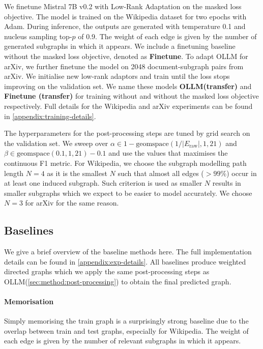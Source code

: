 \documentclass{article}
\newcommand{\name}{{OLLM}\xspace}
\begin{document}
We finetune Mistral 7B v0.2 \cite{jiang2023mistral} with Low-Rank Adaptation \cite{hu2021lora} on the masked loss objective. The model is trained on the Wikipedia dataset for two epochs with Adam. During inference, the outputs are generated with temperature 0.1 and nucleus sampling \cite{holtzman2019curious} top-$p$ of 0.9. The weight of each edge is given by the number of generated subgraphs in which it appears. We include a finetuning baseline without the masked loss objective, denoted as \textbf{Finetune}. To adapt \name for arXiv, we further finetune the model on 2048 document-subgraph pairs from arXiv. We initialise new low-rank adaptors and train until the loss stops improving on the validation set. We name these models \textbf{\name (transfer)} and \textbf{Finetune (transfer)} for training without and without the masked loss objective respectively. Full details for the Wikipedia and arXiv experiments can be found in \cref{appendix:training-details}.

The hyperparameters for the post-processing steps are tuned by grid search on the validation set. We sweep over $\alpha \in 1 - \text{geomspace}(1 / |E_\text{raw}|, 1, 21)$ and $\beta \in \text{geomspace}(0.1, 1, 21) - 0.1$ and use the values that maximises the continuous F1 metric. For Wikipedia, we choose the subgraph modelling path length $N=4$ as it is the smallest $N$ such that almost all edges ($>99\%$) occur in at least one induced subgraph. Such criterion is used as smaller $N$ results in smaller subgraphs which we expect to be easier to model accurately. We choose $N=3$ for arXiv for the same reason.

\subsection{Baselines}

We give a brief overview of the baseline methods here. The full implementation details can be found in \cref{appendix:exp-details}. All baselines produce weighted directed graphs which we apply the same post-processing steps as \name (\cref{sec:method:post-processing}) to obtain the final predicted graph.

\paragraph{Memorisation}
Simply memorising the train graph is a surprisingly strong baseline due to the overlap between train and test graphs, especially for Wikipedia. The weight of each edge is given by the number of relevant subgraphs in which it appears.
\end{document}
